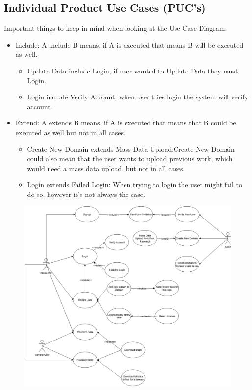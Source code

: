 \documentclass[12pt]{article}
\begin{document}
\subsection{Individual Product Use Cases (PUC's)}
Important things to keep in mind when looking at the Use Case Diagram:
\begin{itemize}
  \item Include: A include B means, if A is executed that means B will be executed as well. 
  \begin{itemize}
    \item Update Data include Login, if user wanted to Update Data they must Login.
    \item Login include Verify Account, when user tries login the system will verify account.
  \end{itemize}
  \item Extend: A extends B means, if A is executed that means that B could be executed as well but not in all cases.
  \begin{itemize}
    \item Create New Domain extends Mass Data Upload:Create New Domain could also mean that the user wants to upload previous work, which would need a mass data upload, but not in all cases.
    \item Login extends Failed Login: When trying to login the user might fail to do so, however it's not always the case.
  \end{itemize}
\end{itemize}
\begin{figure}[H]
    \centering
    \includegraphics[scale=0.45] {images/usecase.png}
\end{figure}
\end{document}
